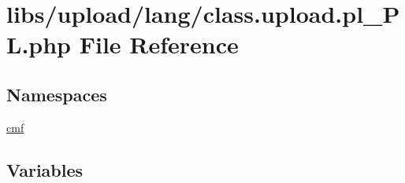 \hypertarget{class_8upload_8pl___p_l_8php}{}\section{libs/upload/lang/class.upload.\+pl\+\_\+\+P\+L.\+php File Reference}
\label{class_8upload_8pl___p_l_8php}
\subsection*{Namespaces}
\begin{DoxyCompactItemize}
\item 
 \hyperlink{namespacecmf}{cmf}
\end{DoxyCompactItemize}
\subsection*{Variables}
